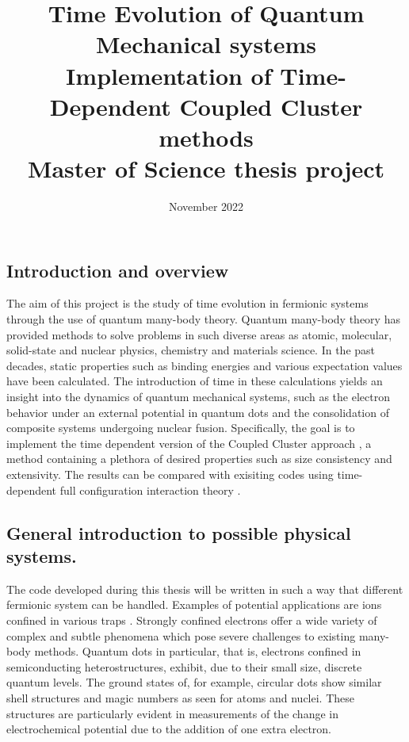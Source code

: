 \documentclass{article}
\title{Time Evolution of Quantum Mechanical systems \\ \vspace{5px} \large Implementation of Time-Dependent Coupled Cluster methods \\ \vspace{20px} \large Master of Science thesis project}
\date{November 2022}
\begin{document}
\maketitle

\subsection*{Introduction and overview}

The aim of this project is the study of time evolution in fermionic
systems through the use of quantum many-body theory. Quantum many-body
theory has provided methods to solve problems in such diverse areas as
atomic, molecular, solid-state and nuclear physics, chemistry and
materials science. In the past decades, static properties such as
binding energies and various expectation values have been
calculated. The introduction of time in these calculations yields an
insight into the dynamics of quantum mechanical systems, such as the
electron behavior under an external potential in quantum dots and the
consolidation of composite systems undergoing nuclear
fusion. Specifically, the goal is to implement the time dependent
version of the Coupled Cluster approach
\cite{Kvaal2012,Schoyen2019,Pigg2012,Hagen2014,Lietz2017}, a method containing a plethora
of desired properties such as size consistency and extensivity. The
results can be compared with exisiting codes using time-dependent full
configuration interaction theory \cite{Skattum2013,Hochstuhl2014}.

\subsection*{General introduction to possible physical systems.}

The code developed during this thesis will be written in such a way
that different fermionic system can be handled. Examples of potential
applications are ions confined in various traps
\cite{Reimann2002}. Strongly confined electrons offer a wide
variety of complex and subtle phenomena which pose severe challenges
to existing many-body methods. Quantum dots in particular, that is,
electrons confined in semiconducting heterostructures, exhibit, due to
their small size, discrete quantum levels. The ground states of, for
example, circular dots show similar shell structures and magic numbers
as seen for atoms and nuclei. These structures are particularly
evident in measurements of the change in electrochemical potential due
to the addition of one extra electron.
\end{document}

